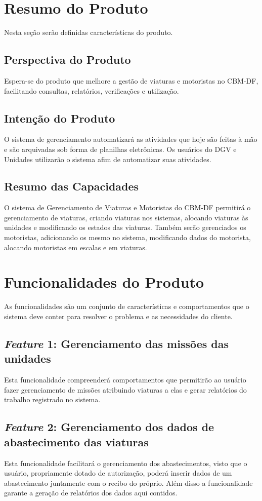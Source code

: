 \begin{apendicesenv}
	\section{Resumo do Produto}
Nesta seção serão definidas características do produto.
		\subsection{Perspectiva do Produto}
Espera-se do produto que melhore a gestão de viaturas e motoristas no CBM-DF, facilitando consultas, relatórios, verificações e utilização.
		\subsection{Intenção do Produto}
O sistema de gerenciamento automatizará as atividades que hoje são feitas à mão e são arquivadas sob forma de planilhas eletrônicas. Os usuários do DGV e Unidades utilizarão o sistema afim de automatizar suas atividades.
		\subsection{Resumo das Capacidades}
O sistema de Gerenciamento de Viaturas e Motoristas do CBM-DF permitirá o gerenciamento de viaturas, criando viaturas nos sistemas, alocando viaturas às unidades e modificando os estados das viaturas. Também serão gerenciados os motoristas, adicionando os mesmo no sistema, modificando dados do motorista, alocando motoristas em escalas e em viaturas.
	\section{Funcionalidades do Produto}
As funcionalidades são um conjunto de características e comportamentos que o sistema deve conter para resolver o problema e as necessidades do cliente.
		\subsection{\textit{Feature} 1: Gerenciamento das missões das unidades}
Esta funcionalidade compreenderá comportamentos que permitirão ao usuário fazer gerenciamento de missões atribuindo viaturas a elas e gerar relatórios do trabalho registrado no sistema.
		\subsection{\textit{Feature} 2: Gerenciamento dos dados de abastecimento das viaturas}
Esta funcionalidade facilitará o gerenciamento dos abastecimentos, visto que o usuário, propriamente dotado de autorização, poderá inserir dados de um abastecimento juntamente com o recibo do próprio. Além disso a funcionalidade garante a geração de relatórios dos dados aqui contidos.

\end{apendicesenv}
